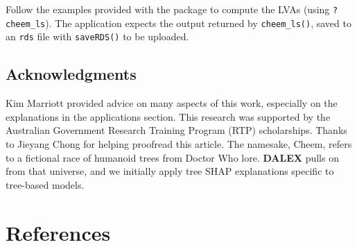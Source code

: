 \documentclass[
]{article}
\begin{document}
Follow the examples provided with the package to compute the LVAs (using \texttt{?cheem\_ls}). The application expects the output returned by \texttt{cheem\_ls()}, saved to an \texttt{rds} file with \texttt{saveRDS()} to be uploaded.

\hypertarget{acknowledgments}{%
\subsection*{Acknowledgments}\label{acknowledgments}}

Kim Marriott provided advice on many aspects of this work, especially on the explanations in the applications section. This research was supported by the Australian Government Research Training Program (RTP) scholarships. Thanks to Jieyang Chong for helping proofread this article. The namesake, Cheem, refers to a fictional race of humanoid trees from Doctor Who lore. \textbf{DALEX} pulls on from that universe, and we initially apply tree SHAP explanations specific to tree-based models.

\hypertarget{references}{%
\section*{References}\label{references}}
\end{document}
